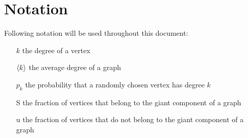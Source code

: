 \chapter*{Notation} %
\label{cha:notation}

Following notation will be used throughout this document:
\begin{itemize}
	\item[$k$] the degree of a vertex
	\item[$\left< k \right>$] the average degree of a graph
	\item[$p_k$] the probability that a randomly chosen vertex has degree $k$
	\item[S] the fraction of vertices that belong to the giant component of a graph
	\item[u] the fraction of vertices that do not belong to the giant component of a graph
\end{itemize}
